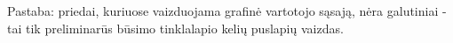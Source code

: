 \documentclass{VUMIFPSkursinis}
\begin{document}
%
%

Pastaba: priedai, kuriuose vaizduojama grafinė vartotojo sąsają, nėra galutiniai - tai tik preliminarūs būsimo tinklalapio kelių puslapių vaizdas.
\end{document}
